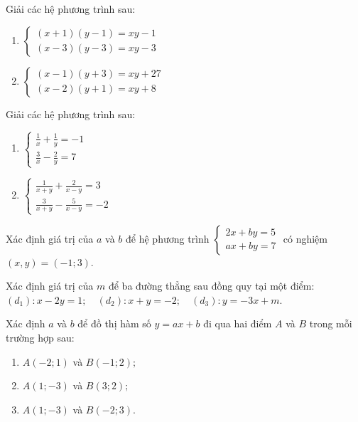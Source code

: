 \documentclass[%
    fontsize=12pt,%
    chapterprefix=false,%
    open=right,%
    twoside=false,%
    numbers=noenddot,%
    headings=optiontohead,%
    final,%
    DIV=15,%
    parskip=half %
]{scrbook}
\begin{document}
\begin{tuluan}
\item Giải các hệ phương trình sau:
\begin{enumerate}[label=\alph*)]
  \item[a)] $ \begin{cases} (x + 1)(y - 1) = xy - 1 \\ (x - 3)(y - 3) = xy - 3 \end{cases} $
  \item[b)] $ \begin{cases} (x - 1)(y + 3) = xy + 27 \\ (x - 2)(y + 1) = xy + 8 \end{cases} $
\end{enumerate}

\item Giải các hệ phương trình sau:
\begin{enumerate}[label=\alph*)]
  \item[a)] $ \begin{cases} \frac{1}{x} + \frac{1}{y} = -1 \\ \frac{3}{x} - \frac{2}{y} = 7 \end{cases} $
  \item[b)] $ \begin{cases} \frac{1}{x + y} + \frac{2}{x - y} = 3 \\ \frac{3}{x + y} - \frac{5}{x - y} = -2 \end{cases} $
\end{enumerate}

\item Xác định giá trị của $ a $ và $ b $ để hệ phương trình $ \begin{cases} 2x + by = 5 \\ ax + by = 7 \end{cases} $ có nghiệm $ (x, y) = (-1; 3) $.

\item Xác định giá trị của $ m $ để ba đường thẳng sau đồng quy tại một điểm: $ (d_1): x - 2y = 1; \quad (d_2): x + y = -2; \quad (d_3): y = -3x + m. $

\item Xác định $ a $ và $ b $ để đồ thị hàm số $ y = ax + b $ đi qua hai điểm $ A $ và $ B $ trong mỗi trường hợp sau:
\begin{enumerate}[label=\alph*)]
  \item[a)] $ A(-2; 1) $ và $ B(-1; 2); $
  \item[b)] $ A(1; -3) $ và $ B(3; 2); $
  \item[c)] $ A(1; -3) $ và $ B(-2; 3). $
\end{enumerate}


\end{tuluan}
\end{document}
